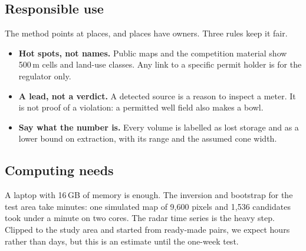 \subsection{Responsible use}\label{sec:ethics}

The method points at places, and places have owners. Three rules keep it fair.

\begin{itemize}
\item \textbf{Hot spots, not names.} Public maps and the competition material show 500\,m cells and
land-use classes. Any link to a specific permit holder is for the regulator only.
\item \textbf{A lead, not a verdict.} A detected source is a reason to inspect a meter. It is not
proof of a violation: a permitted well field also makes a bowl.
\item \textbf{Say what the number is.} Every volume is labelled as lost storage and as a lower bound
on extraction, with its range and the assumed cone width.
\end{itemize}

\subsection{Computing needs}

A laptop with 16\,GB of memory is enough. The inversion and bootstrap for the test area take
minutes: one simulated map of 9,600 pixels and 1,536 candidates took under a minute on two cores.
The radar time series is the heavy step. Clipped to the study area and started from ready-made
pairs, we expect hours rather than days, but this is an estimate until the one-week test.
